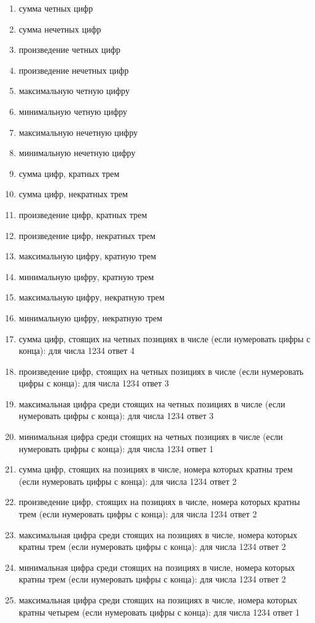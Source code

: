 \begin{enumerate}
\item сумма четных цифр
\item сумма нечетных цифр
\item произведение четных цифр
\item произведение нечетных цифр
\item максимальную четную цифру
\item минимальную четную цифру
\item максимальную нечетную цифру
\item минимальную нечетную цифру

\item сумма цифр, кратных трем
\item сумма цифр, некратных трем
\item произведение цифр, кратных трем
\item произведение цифр, некратных трем
\item максимальную цифру, кратную трем
\item минимальную цифру, кратную трем
\item максимальную цифру, некратную трем
\item минимальную цифру, некратную трем

\item сумма цифр, стоящих на четных позициях в числе (если нумеровать цифры с конца): для числа 1234 ответ 4
\item произведение цифр, стоящих на четных позициях в числе (если нумеровать цифры с конца): для числа 1234 ответ 3
\item максимальная цифра среди стоящих на четных позициях в числе (если нумеровать цифры с конца): для числа 1234 ответ 3
\item минимальная цифра среди стоящих на четных позициях в числе (если нумеровать цифры с конца): для числа 1234 ответ 1

\item сумма цифр, стоящих на позициях в числе, номера которых кратны трем (если нумеровать цифры с конца): для числа 1234 ответ 2
\item произведение цифр, стоящих на позициях в числе, номера которых кратны трем (если нумеровать цифры с конца): для числа 1234 ответ 2
\item максимальная цифра среди стоящих на позициях в числе, номера которых кратны трем (если нумеровать цифры с конца): для числа 1234 ответ 2
\item минимальная цифра среди стоящих на позициях в числе, номера которых кратны трем (если нумеровать цифры с конца): для числа 1234 ответ 2

\item максимальная цифра среди стоящих на позициях в числе, номера которых кратны четырем (если нумеровать цифры с конца): для числа 1234 ответ 1 
\end{enumerate}


